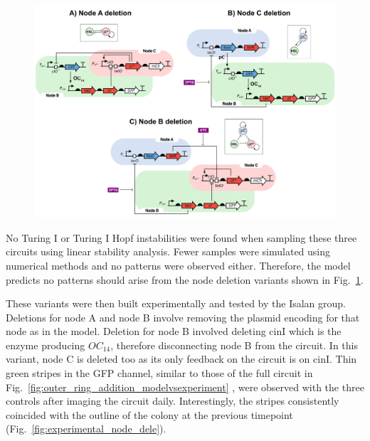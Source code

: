 \begin{figure}[H] %
    \centering
    \begin{adjustbox}{center}
        \includegraphics[width=1.1\textwidth]{chapters/Chapter 3/deletion_circuits} %
    \end{adjustbox}
    \caption{}
    \label{fig:deletion_circuits}
\end{figure}

No Turing I or Turing I Hopf instabilities were found when sampling these three circuits using linear stability analysis. %
Fewer samples were simulated using numerical methods and no patterns were observed either. %
Therefore, the model predicts no patterns should arise from the node deletion variants shown in Fig.~\ref{fig:deletion_circuits}.

These variants were then built experimentally and tested by the
Isalan group.
Deletions for node A and node B involve removing the plasmid encoding for that node as in the model.
Deletion for node B involved deleting cinI which is the enzyme producing $OC_{14}$, therefore disconnecting node B from the circuit.
In this variant, node C is deleted too as its only feedback on the circuit is on cinI.
Thin green stripes in the GFP channel, similar to those of the full circuit in Fig.~\ref{fig:outer_ring_addition_modelvsexperiment} , were observed with the three controls after imaging the circuit daily.
Interestingly, the stripes consistently coincided with the outline of the colony at the previous timepoint (Fig.~\ref{fig:experimental_node_dele}).

